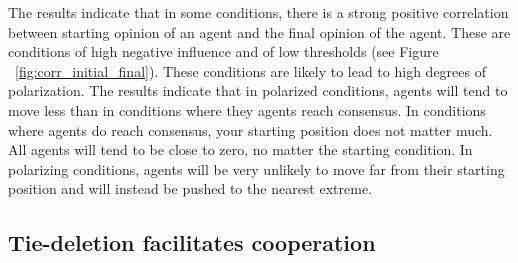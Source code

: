 \documentclass{article}
\begin{document}
The results indicate that in some conditions, there is a strong positive correlation between starting opinion of an agent and the final opinion of the agent. 
These are conditions of high negative influence and of low thresholds (see Figure ~\ref{fig:corr_initial_final}). These conditions are likely to lead to high degrees of polarization. The results indicate that in polarized conditions, agents will tend to move less than in conditions where they agents reach consensus. In conditions where agents do reach consensus, your starting position does not matter much. All agents will tend to be close to zero, no matter the starting condition. In polarizing conditions, agents will be very unlikely to move far from their starting position and will instead be pushed to the nearest extreme. 

\subsection{Tie-deletion facilitates cooperation}
\end{document}

